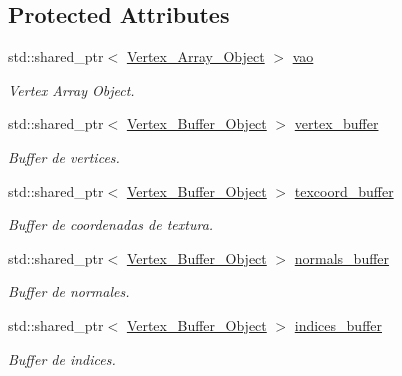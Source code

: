 \subsection*{Protected Attributes}
\begin{DoxyCompactItemize}
\item 
std\+::shared\+\_\+ptr$<$ \mbox{\hyperlink{classexample_1_1_vertex___array___object}{Vertex\+\_\+\+Array\+\_\+\+Object}} $>$ \mbox{\hyperlink{classexample_1_1_mesh_a11c5511c7117fcd333ccb17b9a66c316}{vao}}
\begin{DoxyCompactList}\small\item\em Vertex Array Object. \end{DoxyCompactList}\item 
std\+::shared\+\_\+ptr$<$ \mbox{\hyperlink{classexample_1_1_vertex___buffer___object}{Vertex\+\_\+\+Buffer\+\_\+\+Object}} $>$ \mbox{\hyperlink{classexample_1_1_mesh_a9a1e6b7058389c23eef2193c1c5d644c}{vertex\+\_\+buffer}}
\begin{DoxyCompactList}\small\item\em Buffer de vertices. \end{DoxyCompactList}\item 
std\+::shared\+\_\+ptr$<$ \mbox{\hyperlink{classexample_1_1_vertex___buffer___object}{Vertex\+\_\+\+Buffer\+\_\+\+Object}} $>$ \mbox{\hyperlink{classexample_1_1_mesh_a86a174c1c48a93217f52b5c3831e85c8}{texcoord\+\_\+buffer}}
\begin{DoxyCompactList}\small\item\em Buffer de coordenadas de textura. \end{DoxyCompactList}\item 
std\+::shared\+\_\+ptr$<$ \mbox{\hyperlink{classexample_1_1_vertex___buffer___object}{Vertex\+\_\+\+Buffer\+\_\+\+Object}} $>$ \mbox{\hyperlink{classexample_1_1_mesh_a64ef7d61c1124e69d7f178cffaa42523}{normals\+\_\+buffer}}
\begin{DoxyCompactList}\small\item\em Buffer de normales. \end{DoxyCompactList}\item 
std\+::shared\+\_\+ptr$<$ \mbox{\hyperlink{classexample_1_1_vertex___buffer___object}{Vertex\+\_\+\+Buffer\+\_\+\+Object}} $>$ \mbox{\hyperlink{classexample_1_1_mesh_ac61fd0883693b544b3f9d684f4c38e9a}{indices\+\_\+buffer}}
\begin{DoxyCompactList}\small\item\em Buffer de indices. \end{DoxyCompactList}\end{DoxyCompactItemize}


